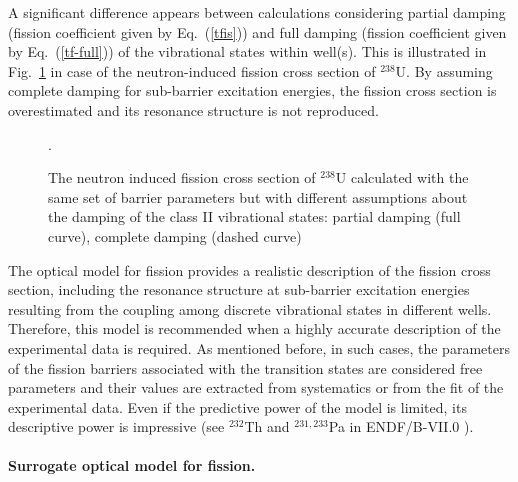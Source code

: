 A significant difference appears between calculations considering partial
damping (fission coefficient given by Eq.~(\ref{tfis})) and full damping
(fission coefficient given by Eq.~(\ref{tf-full})) of the vibrational states
within well(s). This is illustrated in Fig.~\ref{fis-u38-fcom} in case
of the
neutron-induced fission cross section of $^{238}$U. By assuming complete
damping for sub-barrier excitation energies, the fission cross section is
overestimated and its resonance structure is not reproduced.
\begin{figure}[htbp]
 .
\caption{The neutron induced fission cross section of $^{238}$U calculated with
the same set of barrier parameters but with different assumptions about the
damping of the class II vibrational states: partial damping (full curve),
complete damping (dashed curve)}
\label{fis-u38-fcom}
\end{figure}

The optical model for fission provides a realistic description of the
fission cross section, including the resonance structure at sub-barrier
excitation energies resulting from the coupling among discrete vibrational
states in different wells. Therefore, this model is recommended when a
highly
accurate description of the experimental data is required. As mentioned before,
in such cases, the parameters of the fission barriers associated with the
transition states are considered free parameters and their values are
extracted from systematics or from the fit of the experimental data. Even if
the predictive power of the model is limited, its descriptive power is
impressive (see $^{232}$Th and $^{231,233}$Pa in ENDF/B-VII.0\cite{ENDF-VII}%
).

\medskip %

\paragraph*{Surrogate optical model for fission.}

